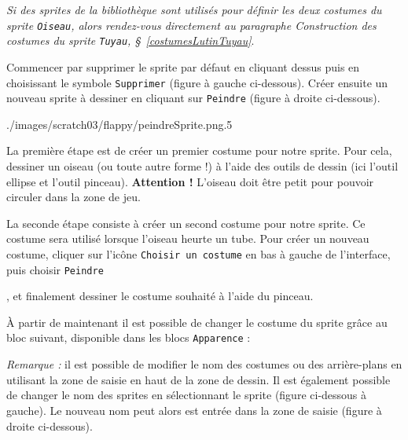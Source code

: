 \vspace{3pt}

\emph{Si des sprites de la bibliothèque sont utilisés pour définir les deux costumes du sprite \texttt{Oiseau}, alors rendez-vous directement au paragraphe \emph{Construction des costumes du sprite \texttt{Tuyau}}, \S\ \vref{costumesLutinTuyau}}.

\vspace{6pt}

Commencer par supprimer le sprite par défaut en cliquant dessus puis en choisissant le symbole \texttt{Supprimer} (figure à gauche ci-dessous). Créer ensuite un nouveau sprite à dessiner en cliquant sur \texttt{Peindre} (figure à droite ci-dessous).

%
	      {./images/scratch03/flappy/peindreSprite.png}{.5\textwidth}

La première étape est de créer un premier costume pour notre sprite. Pour cela, dessiner un oiseau (ou toute autre forme !) à l'aide des outils de dessin (ici l'outil ellipse et l'outil pinceau). \textbf{Attention !} L'oiseau doit être petit pour pouvoir circuler dans la zone de jeu.





La seconde étape consiste à créer un second costume pour notre sprite. Ce costume sera utilisé lorsque l'oiseau heurte un tube. Pour créer un nouveau costume, cliquer sur l'icône \texttt{Choisir un costume} en bas à gauche de l'interface, puis choisir \texttt{Peindre}


, et finalement dessiner le costume souhaité à l'aide du pinceau. 



À partir de maintenant il est possible de changer le costume du sprite grâce au bloc suivant, disponible dans les blocs \texttt{Apparence} :



\emph{Remarque :} il est possible de modifier le nom des costumes ou des arrière-plans en utilisant la zone de saisie en haut de la zone de dessin. Il est également possible de changer le nom des sprites en sélectionnant le sprite (figure ci-dessous à gauche). Le nouveau nom peut alors est entrée dans la zone de saisie (figure à droite ci-dessous).

